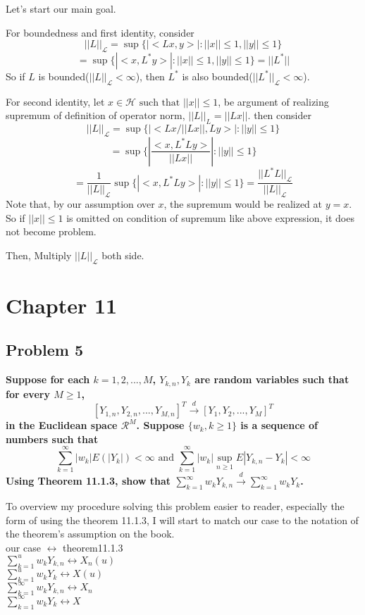 \documentclass{article}
\begin{document}
Let's start our main goal.

For boundedness and first identity, consider
\[||L||_\mathcal{{L}}=\sup\{|<Lx, y>| :||x||\leq 1, ||y||\leq 1\}\]
\[=\sup\{|<x, L^*y>| :||x||\leq 1, ||y||\leq 1\} = ||L^*||\]
So if $L$ is bounded($||L||_\mathcal{L}<\infty$), then $L^*$ is also bounded($||L^*||_\mathcal{L}<\infty$).

For second identity, 
let $x\in \mathcal{H} \text{ such that } ||x||\leq 1$, be argument of realizing supremum of definition of operator norm, \(||L||_{L}=||Lx||\).
then consider
\[||L||_\mathcal{{L}}=\sup\{|<Lx/||Lx||, Ly>| : ||y||\leq 1\}\]
\[=\sup\{|\frac{<x, L^*Ly>}{{||Lx||}}| : ||y||\leq 1\}\]
\[=\frac{1}{||L||_{\mathcal{L}}}\sup\{|<x, L^*Ly>| : ||y||\leq 1\}=\frac{||L^*L||_{\mathcal{L}}}{||L||_{\mathcal{L}}}\]
Note that, by our assumption over $x$, the supremum would be realized at $y=x$. So if $||x||\leq1$ is omitted on condition of supremum like above expression, it does not become problem.

Then, Multiply $||L||_{\mathcal{L}}$ both side.

\newpage
\section{Chapter 11}
\subsection{Problem 5}
\textbf{
    Suppose for each $k=1,2,...,M$, $Y_{k,n}, Y_k$ are random variables such that for every $M\geq 1$,
    \[ [Y_{1,n},Y_{2,n},...,Y_{M,n}]^T\xrightarrow{d} [Y_1,Y_2,...,Y_M]^T\]
    in the Euclidean space $\mathcal{R}^M$. Suppose $\{w_k, k\geq 1\}$ is a sequence of numbers such that
    \[\sum_{k=1}^{\infty}|w_k| E(|Y_k|)<\infty \text{ and } \sum_{k=1}^{\infty}|w_k|\sup_{n\geq 1}E|Y_{k,n}-Y_k|<\infty\]
    Using Theorem 11.1.3, show that \(\sum_{k=1}^{\infty}w_kY_{k,n}\xrightarrow{d}\sum_{k=1}^{\infty}w_kY_k\).
}

To overview my procedure solving this problem easier to reader, especially the form of using the theorem 11.1.3, 
I will start to match our case to the notation of the theorem's assumption on the book. \\
our case $\leftrightarrow$ theorem11.1.3 \\
\(\sum_{k=1}^{u}w_kY_{k,n} \leftrightarrow X_n(u) \) \\
\(\sum_{k=1}^{u}w_kY_{k} \leftrightarrow X(u) \) \\
\(\sum_{k=1}^{\infty}w_kY_{k,n} \leftrightarrow X_n \) \\
\(\sum_{k=1}^{\infty}w_kY_{k} \leftrightarrow X \) \\
\end{document}
